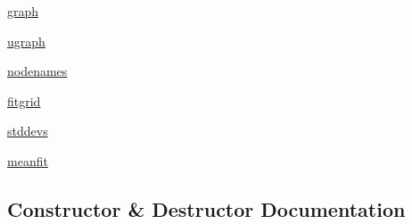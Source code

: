 \begin{DoxyCompactItemize}
\hyperlink{class_uni_dec_1_1unidec__modules_1_1_uni_fit_1_1_k_dmodel_a433de82b2314a55227a31d88eb365525}{graph}
\item 
\hyperlink{class_uni_dec_1_1unidec__modules_1_1_uni_fit_1_1_k_dmodel_a4dafce669a87e4aa2b6f0a4cd5d7aec0}{ugraph}
\item 
\hyperlink{class_uni_dec_1_1unidec__modules_1_1_uni_fit_1_1_k_dmodel_ab770f904e9fabed1849e013fd20b2950}{nodenames}
\item 
\hyperlink{class_uni_dec_1_1unidec__modules_1_1_uni_fit_1_1_k_dmodel_a9f79bb8287f0da14440b25a30f24d6a6}{fitgrid}
\item 
\hyperlink{class_uni_dec_1_1unidec__modules_1_1_uni_fit_1_1_k_dmodel_adff52bfd1d01507e2377ae16219d19db}{stddevs}
\item 
\hyperlink{class_uni_dec_1_1unidec__modules_1_1_uni_fit_1_1_k_dmodel_a685571a70a2873bedb2caab9bdc1c203}{meanfit}
\end{DoxyCompactItemize}


\subsection{Constructor \& Destructor Documentation}
\hypertarget{class_uni_dec_1_1unidec__modules_1_1_uni_fit_1_1_k_dmodel_ac6a44a79a7137fd8941a0bc99fbc7ec2}{}
